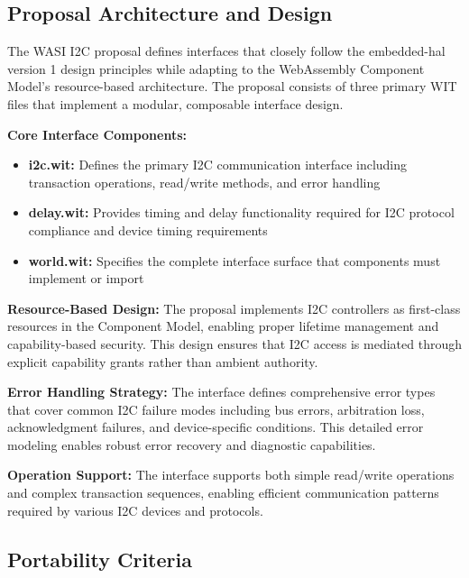 \subsection{Proposal Architecture and Design}
\label{subsec:i2c-proposal-design}

The WASI I2C proposal defines interfaces that closely follow the embedded-hal version 1 design principles while adapting to the WebAssembly Component Model's resource-based architecture. The proposal consists of three primary WIT files that implement a modular, composable interface design.

\textbf{Core Interface Components:}
\begin{itemize}
    \item \textbf{i2c.wit:} Defines the primary I2C communication interface including transaction operations, read/write methods, and error handling
    \item \textbf{delay.wit:} Provides timing and delay functionality required for I2C protocol compliance and device timing requirements
    \item \textbf{world.wit:} Specifies the complete interface surface that components must implement or import
\end{itemize}


\textbf{Resource-Based Design:} The proposal implements I2C controllers as first-class resources in the Component Model, enabling proper lifetime management and capability-based security. This design ensures that I2C access is mediated through explicit capability grants rather than ambient authority.

\textbf{Error Handling Strategy:} The interface defines comprehensive error types that cover common I2C failure modes including bus errors, arbitration loss, acknowledgment failures, and device-specific conditions. This detailed error modeling enables robust error recovery and diagnostic capabilities.

\textbf{Operation Support:} The interface supports both simple read/write operations and complex transaction sequences, enabling efficient communication patterns required by various I2C devices and protocols.

\subsection{Portability Criteria}
\label{subsec:i2c-portability}

